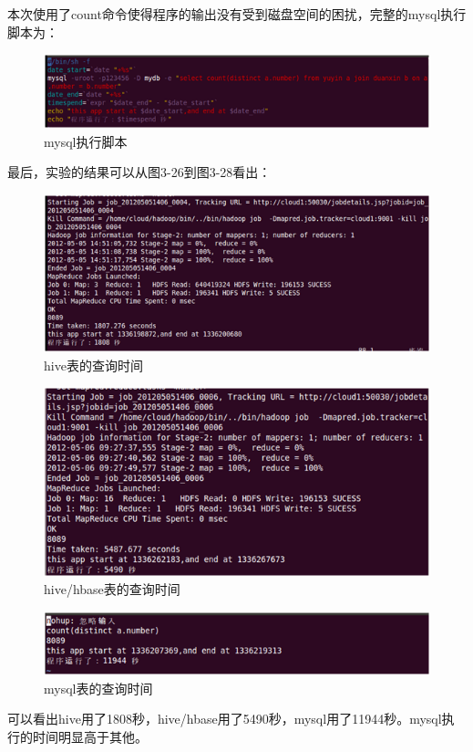 本次使用了count命令使得程序的输出没有受到磁盘空间的困扰，完整的mysql执行脚本为：
\begin{figure}[!ht]
\centering
\includegraphics[]{photo/jb2.png} 
\caption{mysql执行脚本}
\end{figure} 



最后，实验的结果可以从图3-26到图3-28看出：
\begin{description}

\item
\begin{figure}[!ht]
\centering
\includegraphics[]{photo/dfh1.png} 
\caption{hive表的查询时间}
\end{figure} 

\clearpage
\item
\begin{figure}[!ht]
\centering
\includegraphics[]{photo/dfh2.png} 
\caption{hive/hbase表的查询时间}
\end{figure} 

\item
\begin{figure}[!ht]
\centering
\includegraphics[]{photo/dfm1.png} 
\caption{mysql表的查询时间}
\end{figure} 

\end{description}
可以看出hive用了1808秒，hive/hbase用了5490秒，mysql用了11944秒。mysql执行的时间明显高于其他。

